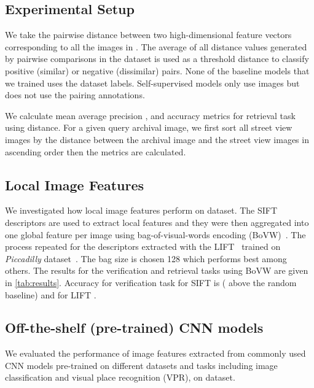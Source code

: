 \documentclass[a4paper,conference]{IEEEtran}
\begin{document}
\subsection{Experimental Setup}
\label{sub:setup}

We take the pairwise distance between two high-dimensional feature vectors corresponding to all the images in \amstertime. The average of all distance values generated by pairwise comparisons in the dataset is used as a threshold distance to classify positive (similar) or negative (dissimilar) pairs. None of the baseline models that we trained uses the dataset labels. Self-supervised models only use \amstertime images but does not use the pairing annotations.





We calculate mean average precision ,  and  accuracy metrics for retrieval task using  distance. For a given query archival image, we first sort all street view images by the distance between the archival image and the street view images in ascending order then the metrics are calculated.


\subsection{Local Image Features}
\label{sub:local}
We investigated how local image features perform on \amstertime dataset. The SIFT~\cite{lowe2004distinctive} descriptors are used to extract local features and they were then aggregated into one global feature per image using bag-of-visual-words encoding (BoVW)~\cite{sivic2003bovw}. The process repeated for the descriptors extracted with the LIFT~\cite{yi2016lift} trained on \textit{Piccadilly} dataset~\cite{wilson2014piccadilly}. The bag size is chosen 128 which performs best among others. The results for the verification and retrieval tasks using BoVW are given in \cref{tab:results}. Accuracy for verification task for SIFT is  ( above the random baseline) and for LIFT . 

\subsection{Off-the-shelf (pre-trained) CNN models}
\label{sub:cnn}
We evaluated the performance of image features extracted from commonly used CNN models pre-trained on different datasets and tasks including image classification and visual place recognition (VPR), on \amstertime dataset.
\end{document}
